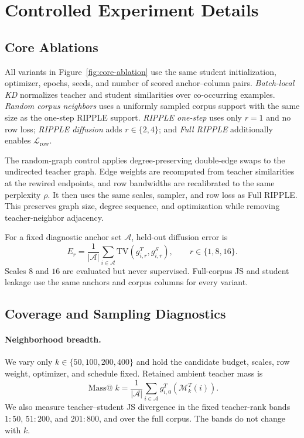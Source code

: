 \section{Controlled Experiment Details}
\label{app:experimental-protocols}

\subsection{Core Ablations}
\label{app:ablation-protocol}

All variants in Figure~\ref{fig:core-ablation} use the same student
initialization, optimizer, epochs, seeds, and number of scored anchor--column
pairs. \emph{Batch-local KD} normalizes teacher and student similarities over
co-occurring examples. \emph{Random corpus neighbors} uses a uniformly sampled
corpus support with the same size as the one-step RIPPLE support.
\emph{RIPPLE one-step} uses only $r=1$ and no row loss; \emph{RIPPLE diffusion}
adds $r\in\{2,4\}$; and \emph{Full RIPPLE} additionally enables
$\mathcal L_{\mathrm{row}}$.

The random-graph control applies degree-preserving double-edge swaps to the
undirected teacher graph. Edge weights are recomputed from teacher
similarities at the rewired endpoints, and row bandwidths are recalibrated to
the same perplexity $\rho$. It then uses the same scales, sampler, and row loss
as Full RIPPLE. This preserves graph size, degree sequence, and optimization
while removing teacher-neighbor adjacency.

For a fixed diagnostic anchor set $\mathcal A$, held-out diffusion error is
\begin{equation}
E_r=\frac1{|\mathcal A|}\sum_{i\in\mathcal A}
\mathrm{TV}(g^T_{i,r},g^S_{i,r}),
\qquad r\in\{1,8,16\}.
\end{equation}
Scales $8$ and $16$ are evaluated but never supervised. Full-corpus JS and
student leakage use the same anchors and corpus columns for every variant.

\subsection{Coverage and Sampling Diagnostics}
\label{app:diagnostic-protocols}

\paragraph{Neighborhood breadth.}
We vary only $k\in\{50,100,200,400\}$ and hold the candidate budget, scales,
row weight, optimizer, and schedule fixed. Retained ambient teacher mass is
\begin{equation}
\operatorname{Mass@}k
=\frac1{|\mathcal A|}\sum_{i\in\mathcal A}
g^T_{i,0}(\mathcal M_k^T(i)).
\end{equation}
We also measure teacher--student JS divergence in the fixed teacher-rank bands
$1{:}50$, $51{:}200$, and $201{:}800$, and over the full corpus. The bands do
not change with $k$.

